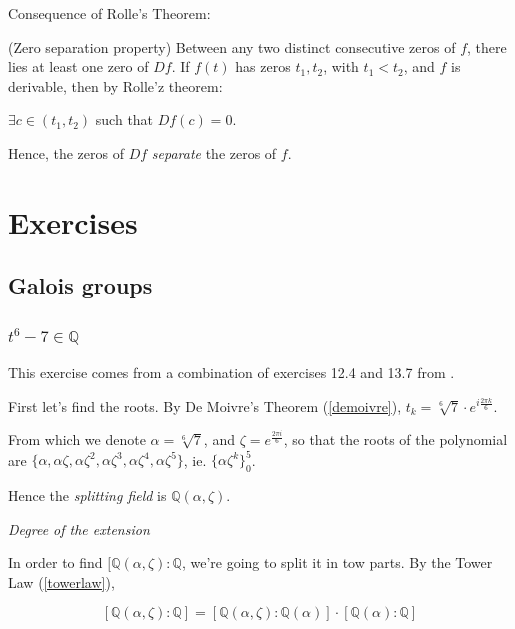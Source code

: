 \documentclass{article}
\theoremstyle{definition}
\newenvironment{cor}[1]
{\renewcommand\theinnercor{#1}\innercor}
{\endinnercor}
\newenvironment{eg}[1]
{\renewcommand\theinnereg{#1}\innereg}
{\endinnereg}
\begin{document}
Consequence of Rolle's Theorem:

\begin{cor}{}(Zero separation property)
  Between any two distinct consecutive zeros of $f$, there lies at least one zero of $Df$.
\end{cor}
\begin{eg}{}
  If $f(t)$ has zeros $t_1, t_2$, with $t_1 < t_2$, and $f$ is derivable, then by Rolle'z theorem:

  $\exists c \in (t_1, t_2)$ such that $Df(c)=0$.

  Hence, the zeros of $Df$ \emph{separate} the zeros of $f$.
\end{eg}

\newpage

\section{Exercises}

\subsection{Galois groups}\label{ex:galoisgroups}

\subsubsection[t6-7]{$t^6-7 \in \mathbb{Q}$}

This exercise comes from a combination of exercises 12.4 and 13.7 from \cite{ianstewart}.

First let's find the roots. By De Moivre's Theorem (\ref{demoivre}), $t_k =
\sqrt[6]{7} \cdot e^{i \frac{2 \pi k}{6}}$.

From which we denote $\alpha = \sqrt[6]{7}$, and $\zeta = e^{\frac{2 \pi i}{6}}$, so that the
roots of the polynomial are $\{ \alpha, \alpha \zeta, \alpha \zeta^2, \alpha \zeta^3, \alpha \zeta^4, \alpha \zeta^5\}$, ie. 
$\{ \alpha \zeta^k \}_0^5$.

Hence the \emph{splitting field} is $\mathbb{Q}(\alpha, \zeta)$.

\emph{Degree of the extension}

In order to find $[\mathbb{Q}(\alpha, \zeta) : \mathbb{Q}$, we're going to split it in tow
parts. By the Tower Law (\ref{towerlaw}),

$$[\mathbb{Q}(\alpha, \zeta) : \mathbb{Q}] = [\mathbb{Q}(\alpha, \zeta) : \mathbb{Q}(\alpha)] \cdot [\mathbb{Q}(\alpha) : \mathbb{Q}]$$
\end{document}

